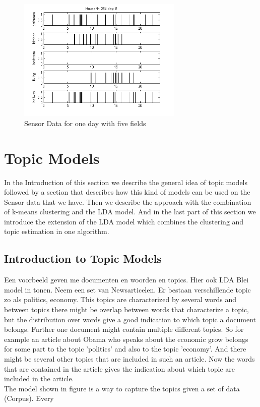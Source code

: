 \documentclass[11pt,a4paper]{article}
\begin{document}
\begin{figure}[h!]
  \centering
    	\includegraphics[width=0.7\textwidth]{Pictures/plainDataExample.png}
    \caption{Sensor Data for one day with five fields}
    \label{fig:PlaineSensorData}
\end{figure}












\pagebreak
\section{Topic Models}
\label{sec:TopicModels}
In the Introduction of this section we describe the general idea of topic models followed by a section that describes how this kind of models can be used on the Sensor data that we have. Then we describe the approach with the combination of k-means clustering and the LDA model. And in the last part of this section we introduce the extension of the LDA model which combines the clustering and topic estimation in one algorithm.

\subsection{Introduction to Topic Models}
Een voorbeeld geven me documenten en woorden en topics. Hier ook LDA Blei model in tonen.
Neem een set van Newsarticelen. Er bestaan verschillende topic zo als politics, economy. This topics are characterized by several words and between topics there might be overlap between words that characterize a topic, but the distribution over words give a good indication to which topic a document belongs. Further one document might contain multiple different topics. So for example an article about Obama who speaks about the economic grow belongs for some part to the topic 'politics' and also to the topic 'economy'. And there might be several other topics that are included in such an article. Now the words that are contained in the article gives the indication about which topic are included in the article.\\
The model shown in figure is a way to capture the topics given a set of data (Corpus). Every  
\end{document}

